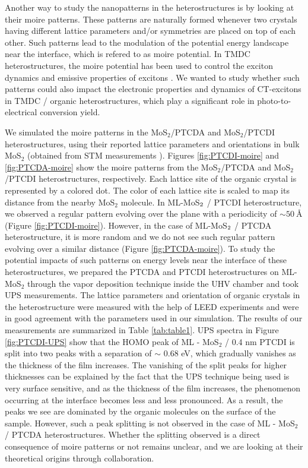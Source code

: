\documentclass[12pt]{article}
\begin{document}
Another way to study the nanopatterns in the heterostructures is by looking at their moire patterns. These patterns are naturally formed whenever two crystals having different lattice parameters and/or symmetries are placed on top of each other. Such patterns lead to the modulation of the potential energy landscape near the interface, which is refered to as moire potential. In TMDC heterostructures, the moire potential has been used to control the exciton dynamics and emissive properties of excitons \cite{yuan2020twist,bai2020excitons,seyler2019signatures}. We wanted to study whether such patterns could also impact the electronic properties and dynamics of CT-excitons in TMDC / organic heterostructures, which play a significant role in photo-to-electrical conversion yield.

\vspace{7pt}

We simulated the moire patterns in the MoS$_2$/PTCDA and MoS$_2$/PTCDI heterostructures, using their reported lattice parameters and orientations in bulk MoS$_2$ (obtained from STM measurements \cite{ludwig1994stm}). Figures \ref{fig:PTCDI-moire} and \ref{fig:PTCDA-moire} show the moire patterns from the MoS$_2$/PTCDA and MoS$_2$/PTCDI heterostructures, respectively. Each lattice site of the organic crystal is represented by a colored dot. The color of each lattice site is scaled to map its distance from the nearby MoS$_2$ molecule. In ML-MoS$\protect_2$ / PTCDI heterostructure, we observed a regular pattern evolving over the plane with a periodicity of $\sim \SI{50}{\angstrom}$ (Figure \ref{fig:PTCDI-moire}). However, in the case of ML-MoS$\protect_2$ / PTCDA heterostructure, it is more random and we do not see such regular pattern evolving over a similar distance (Figure \ref{fig:PTCDA-moire}). To study the potential impacts of such patterns on energy levels near the interface of these heterostructures, we prepared the PTCDA and PTCDI heterostructures on ML-MoS$_2$ through the vapor deposition technique inside the UHV chamber and took UPS measurements. The lattice parameters and orientation of organic crystals in the heterostructure were measured with the help of LEED experiments and were in good agreement with the parameters used in our simulation. The results of our measurements are summarized in Table \ref{tab:table1}. UPS spectra in Figure \ref{fig:PTCDI-UPS} show that the HOMO peak of ML - MoS$_2$ / 0.4 nm PTCDI is split into two peaks with a separation of $\sim$ 0.68 eV, which gradually vanishes as the thickness of the film increases. The vanishing of the split peaks for higher thicknesses can be explained by the fact that the UPS technique being used is very surface sensitive, and as the thickness of the film increases, the phenomenon occurring at the interface becomes less and less pronounced. As a result, the peaks we see are dominated by the organic molecules on the surface of the sample. However, such a peak splitting is not observed in the case of ML - MoS$_2$ / PTCDA heterostructures. Whether the splitting observed is a direct consequence of moire patterns or not remains unclear, and we are looking at their theoretical origins through collaboration.
\end{document}
